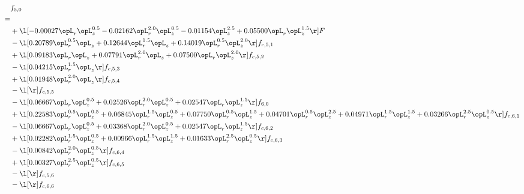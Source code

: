 \begin{alignat}{2} 
\label{eq:f_50_2} 
& f_{5,0} \nonumber \\ 
 = \\ 
& + \l[  -0.00027 \opL_r \opL_z^{0.5}   -0.02162 \opL_r^{2.0} \opL_z^{0.5}   -0.01154 \opL_z^{2.5} +  0.05500 \opL_r \opL_z^{1.5}  \r] F \nonumber \\ 
& - \l[  0.20789 \opL_r^{0.5} \opL_z +  0.12644 \opL_r^{1.5} \opL_z +  0.14019 \opL_r^{0.5} \opL_z^{2.0}  \r] f_{c,5,1} \nonumber \\ 
& + \l[  0.09183 \opL_r \opL_z +  0.07791 \opL_r^{2.0} \opL_z +  0.07500 \opL_r \opL_z^{2.0}  \r] f_{c,5,2} \nonumber \\ 
& - \l[  0.04215 \opL_r^{1.5} \opL_z  \r] f_{c,5,3} \nonumber \\ 
& + \l[  0.01948 \opL_r^{2.0} \opL_z  \r] f_{c,5,4} \nonumber \\ 
& - \l[  \r] f_{c,5,5} \nonumber \\ 
& - \l[  0.06667 \opL_r \opL_z^{0.5} +  0.02526 \opL_r^{2.0} \opL_z^{0.5} +  0.02547 \opL_r \opL_z^{1.5}  \r] f_{6,0} \nonumber \\ 
& + \l[  0.22583 \opL_r^{0.5} \opL_z^{0.5} +  0.06845 \opL_r^{1.5} \opL_z^{0.5} +  0.07750 \opL_r^{0.5} \opL_z^{1.5} +  0.04701 \opL_r^{0.5} \opL_z^{2.5} +  0.04971 \opL_r^{1.5} \opL_z^{1.5} +  0.03266 \opL_r^{2.5} \opL_z^{0.5}  \r] f_{c,6,1} \nonumber \\ 
& - \l[  0.06667 \opL_r \opL_z^{0.5} +  0.03368 \opL_r^{2.0} \opL_z^{0.5} +  0.02547 \opL_r \opL_z^{1.5}  \r] f_{c,6,2} \nonumber \\ 
& + \l[  0.02282 \opL_r^{1.5} \opL_z^{0.5} +  0.00966 \opL_r^{1.5} \opL_z^{1.5} +  0.01633 \opL_r^{2.5} \opL_z^{0.5}  \r] f_{c,6,3} \nonumber \\ 
& - \l[  0.00842 \opL_r^{2.0} \opL_z^{0.5}  \r] f_{c,6,4} \nonumber \\ 
& + \l[  0.00327 \opL_r^{2.5} \opL_z^{0.5}  \r] f_{c,6,5} \nonumber \\ 
& - \l[  \r] f_{c,5,6} \nonumber \\ 
& - \l[  \r] f_{c,6,6} \nonumber \\ 
\end{alignat} 


